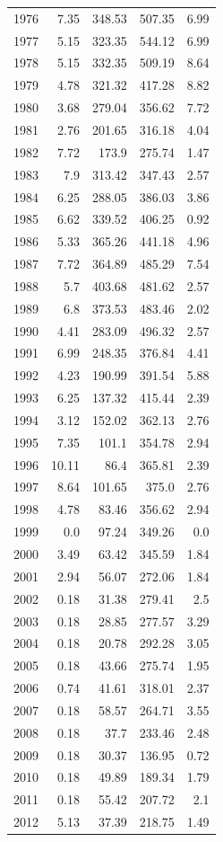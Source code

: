 \documentclass[a4paper]{article}
\begin{document}
\begin{longtable}{rrrrr}
1976 & 7.35 & 348.53 & 507.35 & 6.99\\
1977 & 5.15 & 323.35 & 544.12 & 6.99\\
1978 & 5.15 & 332.35 & 509.19 & 8.64\\
1979 & 4.78 & 321.32 & 417.28 & 8.82\\
1980 & 3.68 & 279.04 & 356.62 & 7.72\\
1981 & 2.76 & 201.65 & 316.18 & 4.04\\
1982 & 7.72 & 173.9 & 275.74 & 1.47\\
1983 & 7.9 & 313.42 & 347.43 & 2.57\\
1984 & 6.25 & 288.05 & 386.03 & 3.86\\
1985 & 6.62 & 339.52 & 406.25 & 0.92\\
1986 & 5.33 & 365.26 & 441.18 & 4.96\\
1987 & 7.72 & 364.89 & 485.29 & 7.54\\
1988 & 5.7 & 403.68 & 481.62 & 2.57\\
1989 & 6.8 & 373.53 & 483.46 & 2.02\\
1990 & 4.41 & 283.09 & 496.32 & 2.57\\
1991 & 6.99 & 248.35 & 376.84 & 4.41\\
1992 & 4.23 & 190.99 & 391.54 & 5.88\\
1993 & 6.25 & 137.32 & 415.44 & 2.39\\
1994 & 3.12 & 152.02 & 362.13 & 2.76\\
1995 & 7.35 & 101.1 & 354.78 & 2.94\\
1996 & 10.11 & 86.4 & 365.81 & 2.39\\
1997 & 8.64 & 101.65 & 375.0 & 2.76\\
1998 & 4.78 & 83.46 & 356.62 & 2.94\\
1999 & 0.0 & 97.24 & 349.26 & 0.0\\
2000 & 3.49 & 63.42 & 345.59 & 1.84\\
2001 & 2.94 & 56.07 & 272.06 & 1.84\\
2002 & 0.18 & 31.38 & 279.41 & 2.5\\
2003 & 0.18 & 28.85 & 277.57 & 3.29\\
2004 & 0.18 & 20.78 & 292.28 & 3.05\\
2005 & 0.18 & 43.66 & 275.74 & 1.95\\
2006 & 0.74 & 41.61 & 318.01 & 2.37\\
2007 & 0.18 & 58.57 & 264.71 & 3.55\\
2008 & 0.18 & 37.7 & 233.46 & 2.48\\
2009 & 0.18 & 30.37 & 136.95 & 0.72\\
2010 & 0.18 & 49.89 & 189.34 & 1.79\\
2011 & 0.18 & 55.42 & 207.72 & 2.1\\
2012 & 5.13 & 37.39 & 218.75 & 1.49\\
\end{longtable}
\end{document}
